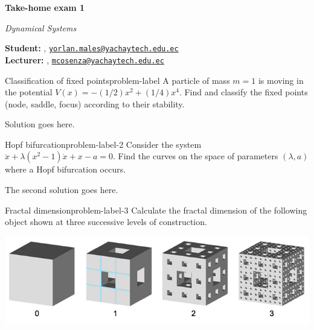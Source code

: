 





\textsf{\LARGE{\textbf{Take-home exam 1}}}

\normalsize{\textit{Dynamical Systems}}

\vspace{1ex}

\textsf{\textbf{Student:}} , 
\href{mailto:yorlan.males@yachaytech.edu.ec}{\texttt{yorlan.males@yachaytech.edu.ec}}\\
\textsf{\textbf{Lecturer:}} , 
\href{mcosenza@yachaytech.edu.ec}{\texttt{mcosenza@yachaytech.edu.ec}}

\vspace{2ex}

\begin{problem}{Classification of fixed points}{problem-label}
A particle of mass $m = 1$ is moving in the potential $V(x) = - (1/2)x^2 + (1/4)x^4$.
Find and classify the fixed points (node, saddle, focus) according to their stability.
\end{problem}

Solution goes here.

\begin{problem}{Hopf bifurcation}{problem-label-2}
Consider the system $\ddot{x} + \lambda(x^2 - 1)\dot{x} + x - a = 0$.
Find the curves on the space of parameters $(\lambda, a)$ where a Hopf bifurcation occurs.
\end{problem}

The second solution goes here.

\begin{problem}{Fractal dimension}{problem-label-3}
Calculate the fractal dimension of the following object
shown at three successive levels of construction.

\begin{center}
    \includegraphics[scale=0.5]{images/cube_fractal.jpg}
\end{center}
\end{problem}

